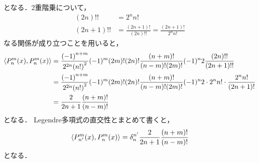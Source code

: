 \documentclass{report}
\begin{document}
    となる．2重階乗について，
    \begin{align}
      (2n)!! &= 2^nn! \\ 
      (2n + 1) !! &= \frac{(2n + 1)!}{(2n)!!} = \frac{(2n + 1)!}{2^nn!}
    \end{align}
    なる関係が成り立つことを用いると，
    \begin{align}
      \left\langle P_{n}^m(x), P_{n}^m(x) \right\rangle &= \frac{\qty(-1)^{n + m}}{2^{2n}\qty(n!)^2}(-1)^m\qty(2m)!\qty(2n)!\frac{(n + m)!}{(n - m)!(2m)!}(-1)^n2\frac{(2n)!!}{(2n + 1)!!} \\
      &=  \frac{\qty(-1)^{n + m}}{2^{2n}\qty(n!)^2}(-1)^m\qty(2m)!\qty(2n)!\frac{(n + m)!}{(n - m)!(2m)!}(-1)^n2\cdot 2^nn! \cdot \frac{2^nn!}{(2n + 1)!} \\
      &= \frac{2}{2n + 1}\frac{(n + m)!}{(n - m)!}
    \end{align}
    となる．
    Legendre多項式の直交性とまとめて書くと，
    \begin{align}
      \left\langle P_{n'}^m(x), P_{n}^m(x) \right\rangle = \delta_{n}^{n'}\frac{2}{2n + 1}\frac{(n + m)!}{(n - m)!}\label{pnm-norm}
    \end{align}
    となる．
\end{document}
